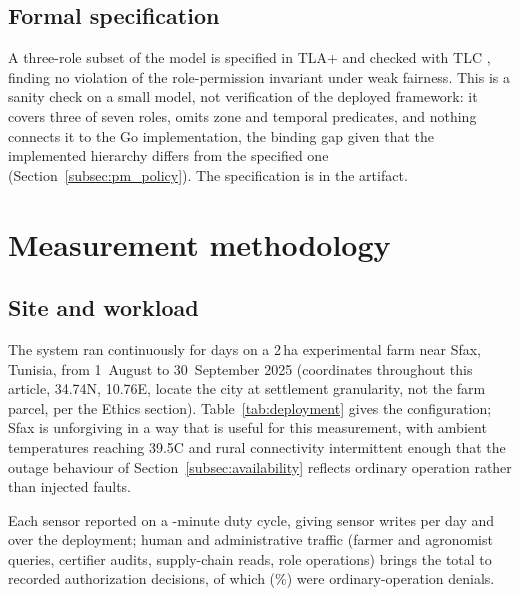 \documentclass[a4paper,fleqn]{cas-sc}
\begin{document}
\subsection{Formal specification}
\label{subsec:tla}

A three-role subset of the model is specified in TLA+ and checked with TLC
\cite{lamport2002specifying,newcombe2015amazon}, finding no violation of
the role-permission invariant under weak fairness. This is a sanity check
on a small model, not verification of the deployed framework: it covers
three of seven roles, omits zone and temporal predicates, and nothing
connects it to the Go implementation, the binding gap given that the
implemented hierarchy differs from the specified one
(Section~\ref{subsec:pm_policy}). The specification is in the artifact.

\FloatBarrier
\section{Measurement methodology}
\label{sec:method}

\subsection{Site and workload}
\label{subsec:deployment}

The system ran continuously for \DeployDays{} days on a 2\,ha experimental
farm near Sfax, Tunisia, from 1~August to 30~September 2025 (coordinates
throughout this article, 34.74\textdegree{}N, 10.76\textdegree{}E, locate
the city at settlement granularity, not the farm parcel, per the Ethics
section). Table~\ref{tab:deployment} gives the configuration; Sfax is
unforgiving in a way that is useful for this measurement, with ambient
temperatures reaching 39.5\textdegree{}C and rural connectivity
intermittent enough that the outage behaviour of
Section~\ref{subsec:availability} reflects ordinary operation rather than
injected faults.

Each sensor reported on a \DutyCycleMinutes-minute duty cycle, giving
\WritesPerDay{} sensor writes per day and \SensorWrites{} over the
deployment; human and administrative traffic (farmer and agronomist
queries, certifier audits, supply-chain reads, role operations) brings the
total to \TotalDecisions{} recorded authorization decisions, of which
\TotalDenied{} (\DenyRatePct\%) were ordinary-operation denials.
\end{document}
